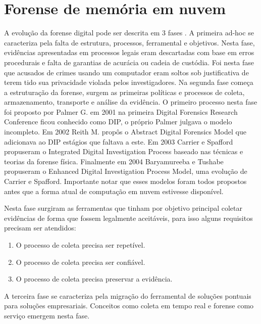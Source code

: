 \documentclass[conference]{IEEEtran}
\begin{document}
\section{Forense de memória em nuvem}
\label{sec:forensics}

A evolução da forense digital pode ser descrita em 3 fases \cite{Charters2008}. A primeira ad-hoc se caracteriza pela falta de estrutura, processos, ferramental e 
objetivos. Nesta fase, evidências apresentadas em processos legais eram descartadas com base em erros procedurais e falta de garantias de acurácia ou cadeia de custódia. 
Foi nesta fase que acusados de crimes usando um computador eram soltos sob justificativa de terem tido sua privacidade violada pelos investigadores. 
Na segunda fase começa a estruturação da forense, surgem as primeiras políticas e processos de coleta, armazenamento, transporte e análise da evidência. O primeiro
processo nesta fase foi proposto por Palmer G. em 2001 na primeira Digital Forensics Research Conference ficou conhecido como DIP, o próprio Palmer julgava o modelo incompleto. Em 2002 
Reith M. propôs o Abstract Digital Forensics Model que adicionava ao DIP estágios que faltava a este. Em 2003 Carrier e Spafford propuseram o Integrated Digital Investigation 
Process baseado nas técnicas e teorias da forense física. Finalmente em 2004 Baryamureeba e Tushabe propuseram o Enhanced Digital Investigation Process Model, uma evolução
de Carrier e Spafford. Importante notar que esses modelos foram todos propostos antes que a forma atual de computação em nuvem estivesse disponível. \cite{Grispos2012}

Nesta fase surgiram as ferramentas que tinham por objetivo principal coletar evidências de forma que fossem legalmente aceitáveis, para isso alguns requisitos precisam 
ser atendidos:

\begin{enumerate}
 \item O processo de coleta precisa ser repetível.
 \item O processo de coleta precisa ser confiável.
 \item O processo de coleta precisa preservar a evidência.
\end{enumerate}

A terceira fase se caracteriza pela migração do ferramental de soluções pontuais para soluções empresariais. Conceitos como coleta em tempo real e forense como serviço emergem
nesta fase.
\end{document}

